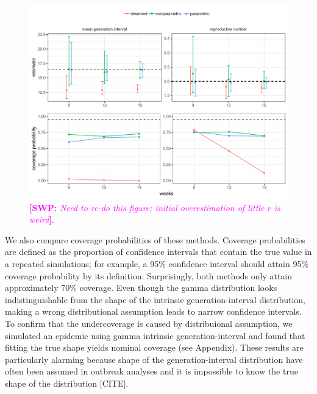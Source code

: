 \documentclass[12pt]{article}
\newcommand{\comment}[3]{\textcolor{#1}{\textbf{[#2: }\textsl{#3}\textbf{]}}}
\newcommand{\swp}[1]{\comment{magenta}{SWP}{#1}}
\begin{document}
\begin{figure}
\includegraphics[width=\textwidth]{../fig/compare_methods.pdf}
\caption{\swp{Need to re-do this figure; initial overestimation of little $r$ is weird}.}
\label{fig:test}
\end{figure}

We also compare coverage probabilities of these methods. 
Coverage probabilities are defined as the proportion of confidence intervals that contain the true value in a repeated simulations; for example, a 95\% confidence interval should attain 95\% coverage probability by its definition.
Surprisingly, both methods only attain approximately 70\% coverage.
Even though the gamma distribution looks indistinguishable from the shape of the intrinsic generation-interval distribution, making a wrong distributional assumption leads to narrow confidence intervals.
To confirm that the undercoverage is caused by distribuional assumption, we simulated an epidemic using gamma intrinsic generation-interval and found that fitting the true shape yields nominal coverage (see Appendix).
These results are particularly alarming because shape of the generation-interval distribution have often been assumed in outbreak analyses and it is impossible to know the true shape of the distribution [CITE].
\end{document}
